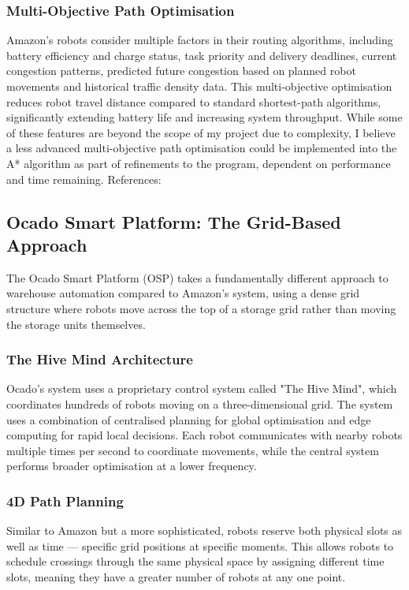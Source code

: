 \subsubsection{Multi-Objective Path Optimisation}
Amazon's robots consider multiple factors in their routing algorithms, including battery efficiency and charge status, task priority and delivery deadlines, current congestion patterns, predicted future congestion based on planned robot movements and historical traffic density data. This multi-objective optimisation reduces robot travel distance compared to standard shortest-path algorithms, significantly extending battery life and increasing system throughput.\newline
\textbf{ }
\newline While some of these features are beyond the scope of my project due to complexity, I believe a less advanced multi-objective path optimisation could be implemented into the A* algorithm as part of refinements to the program, dependent on performance and time remaining. \newline References: \cite{scallog_2024_amazon}

\subsection{Ocado Smart Platform: The Grid-Based Approach}

The Ocado Smart Platform (OSP) takes a fundamentally different approach to warehouse automation compared to Amazon's system, using a dense grid structure where robots move across the top of a storage grid rather than moving the storage units themselves.

\subsubsection{The Hive Mind Architecture}
Ocado's system uses a proprietary control system called "The Hive Mind", which coordinates hundreds of robots moving on a three-dimensional grid. The system uses a combination of centralised planning for global optimisation and edge computing for rapid local decisions. Each robot communicates with nearby robots multiple times per second to coordinate movements, while the central system performs broader optimisation at a lower frequency.

\subsubsection{4D Path Planning}
Similar to Amazon but a more sophisticated, robots reserve both physical slots as well as time — specific grid positions at specific moments. This allows robots to schedule crossings through the same physical space by assigning different time slots, meaning they have a greater number of robots at any one point.

